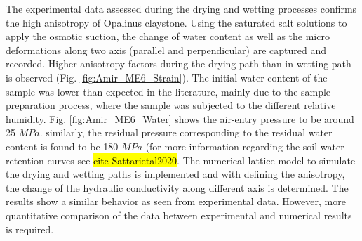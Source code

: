 The experimental data assessed during the drying and wetting processes confirms the high anisotropy of Opalinus claystone. Using the saturated salt solutions to apply the osmotic suction, the change of water content as well as the micro deformations along two axis (parallel and perpendicular) are captured and recorded. Higher anisotropy factors during the drying path than in wetting path is observed (Fig. \ref{fig:Amir_ME6_Strain}). The initial water content of the sample was lower than expected in the literature, mainly due to the sample preparation process, where the sample was subjected to the different relative humidity. Fig. \ref{fig:Amir_ME6_Water} shows the air-entry pressure to be around 25 $MPa$. similarly, the residual pressure corresponding to the residual water content is found to be 180 $MPa$ (for more information regarding the soil-water retention curves see \hl{cite Sattarietal2020}. The numerical lattice model to simulate the drying and wetting paths is implemented and with defining the anisotropy, the change of the hydraulic conductivity along different axis is determined. The results show a similar behavior as seen from experimental data. However, more quantitative comparison of the data between experimental and numerical results is required. 